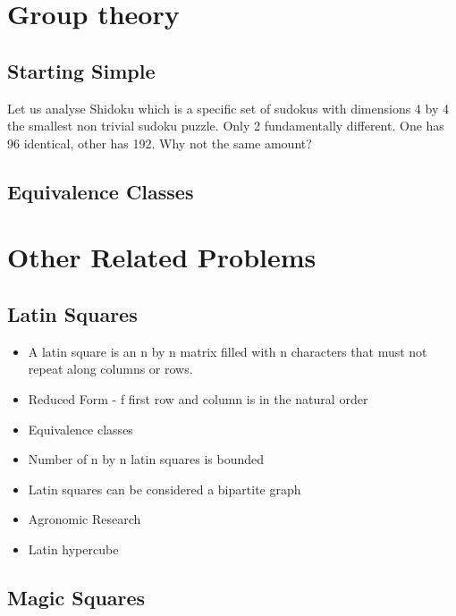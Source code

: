 \documentclass[a4paper,12pt]{article}
\begin{document}
\section{Group theory}
	\subsection{Starting Simple}
		Let us analyse Shidoku which is a specific set of sudokus with dimensions 4 by 4 the smallest non trivial sudoku puzzle. Only 2 fundamentally different. One has 96 identical, other has 192. Why not the same amount?
	\subsection{Equivalence Classes}
\section{Other Related Problems}
	\subsection{Latin Squares}

		\begin{itemize}
		\item{A latin square is an n by n matrix filled with n characters that must not repeat along columns or rows.}
		\item{Reduced Form - f first row and column is in the natural order}
		\item{Equivalence classes}
		\item{Number of n by n latin squares is bounded}
		\item{Latin squares can be considered a bipartite graph}
		\item{Agronomic Research}
		\item{Latin hypercube}
		\end{itemize}

	\subsection{Magic Squares}
\end{document}
